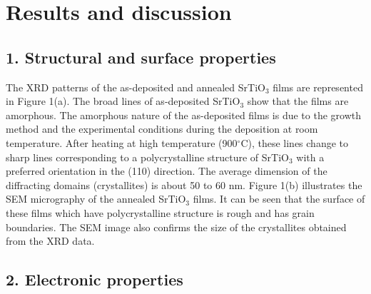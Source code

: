 \documentclass{aip-cp}
\begin{document}
\section{Results and discussion}
\subsection{1. Structural and surface properties}
The XRD patterns of the as-deposited and annealed SrTiO$_{3}$ films are represented in Figure 1(a). The broad lines of as-deposited SrTiO$_{3}$ show that the films are amorphous. The amorphous nature of the as-deposited films is due to the growth method and the experimental conditions during the deposition at room temperature. After heating at high temperature (900$^{\circ}$C), these lines change to sharp lines corresponding to a polycrystalline structure of SrTiO$_{3}$ with a preferred orientation in the (110) direction. The average dimension of the diffracting domains (crystallites) is about 50 to 60 nm. Figure 1(b) illustrates the SEM micrography of the annealed SrTiO$_{3}$ films. It can be seen that the surface of these films which have polycrystalline structure is rough and has grain boundaries. The SEM image also confirms the size of the crystallites obtained from the XRD data.





\subsection{2. Electronic properties}
 
\end{document}
